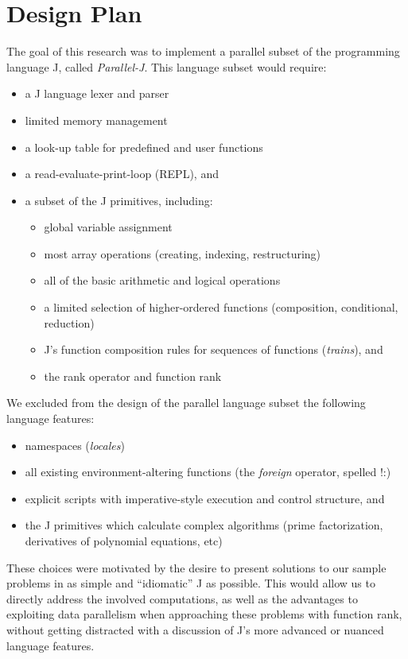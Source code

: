 \section{Design Plan}
\label{desp}
The goal of this research was
to implement a parallel subset of the programming language J, called \textit{Parallel-J}.
This language subset would require:\cite{ioj} 
\begin{itemize}
	\item a J language lexer and parser
	\item limited memory management
	\item a look-up table for predefined and user functions
	\item a read-evaluate-print-loop (REPL), and
	\item a subset of the J primitives, including: 
	\begin{itemize}
		\item global variable assignment
		\item most array operations (creating, indexing, restructuring)
		\item all of the basic arithmetic and logical operations
		\item a limited selection of higher-ordered functions (composition, conditional, reduction)
		\item J's function composition rules for sequences of functions (\textit{trains}), and
		\item the rank operator and function rank
	\end{itemize}
\end{itemize}

We excluded from the design of the parallel language subset the following language features: 
\begin{itemize}
	\item namespaces (\textit{locales})
	\item all existing environment-altering functions (the \textit{foreign} operator, spelled \ttfamily!:\normalfont)
	\item explicit scripts with imperative-style execution and control structure, and
	\item the J primitives which calculate complex algorithms (prime factorization, derivatives of polynomial equations, etc)
\end{itemize}

These choices were motivated by the desire to present solutions to our sample problems in as simple and ``idiomatic'' J as possible.
This would allow us to directly address the involved computations, 
as well as the advantages to exploiting data parallelism when approaching these problems with function rank, 
without getting distracted with a discussion of J's more advanced or nuanced language features.

